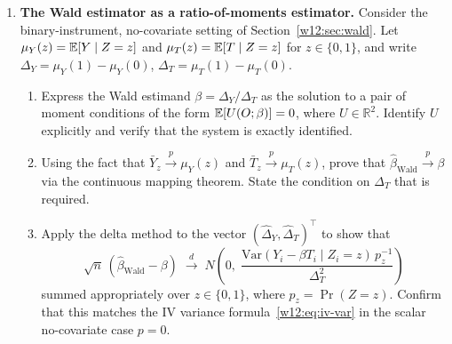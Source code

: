 \documentclass[master.tex]{subfiles}
\begin{document}
\begin{enumerate}

\item \textbf{The Wald estimator as a ratio-of-moments estimator.}
  Consider the binary-instrument, no-covariate setting of
  Section~\ref{w12:sec:wald}.  Let $\mu_Y(z) = \mathbb{E}[Y \mid Z = z]$
  and $\mu_T(z) = \mathbb{E}[T \mid Z = z]$ for $z \in \{0,1\}$, and write
  $\Delta_Y = \mu_Y(1) - \mu_Y(0)$, $\Delta_T = \mu_T(1) - \mu_T(0)$.
  \begin{enumerate}
    \item Express the Wald estimand $\beta = \Delta_Y / \Delta_T$ as
      the solution to a pair of moment conditions of the form
      $\mathbb{E}[U(O;\beta)] = 0$, where $U \in \mathbb{R}^2$.  Identify $U$
      explicitly and verify that the system is exactly identified.
    \item Using the fact that $\bar{Y}_z \xrightarrow{p} \mu_Y(z)$ and
      $\bar{T}_z \xrightarrow{p} \mu_T(z)$, prove that
      $\hat\beta_{\mathrm{Wald}} \xrightarrow{p} \beta$ via the
      continuous mapping theorem.  State the condition on $\Delta_T$
      that is required.
    \item Apply the delta method to the vector
      $(\hat\Delta_Y, \hat\Delta_T)^\top$ to show that
      \[
        \sqrt{n}\,(\hat\beta_{\mathrm{Wald}} - \beta)
        \;\xrightarrow{d}\;
        N\!\left(0,\;
          \frac{\mathrm{Var}(Y_i - \beta T_i \mid Z_i = z)\,p_z^{-1}}
               {\Delta_T^2}
        \right)
      \]
      summed appropriately over $z \in \{0,1\}$, where
      $p_z = \Pr(Z = z)$.  Confirm that this matches the IV
      variance formula~\eqref{w12:eq:iv-var} in the scalar
      no-covariate case $p = 0$.
  \end{enumerate}


\end{enumerate}
\end{document}
